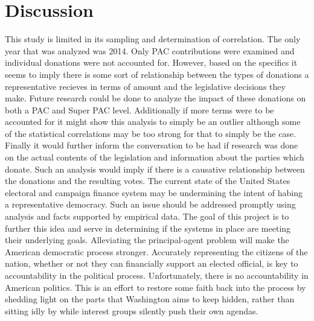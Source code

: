 \documentclass[journal]{IEEEtran}
\begin{document}
\section{Discussion}
This study is limited in its sampling and determination of correlation. The only year that was analyzed was 2014. Only PAC contributions were
examined and individual donations were not accounted for. However, based on the specifics it seems to imply there is some sort of relationship
between the types of donations a representative recieves in terms of amount and the legislative decisions they make.
Future research could be done to analyze the impact of these donations on both a PAC and Super PAC level. Additionally if more terms 
were to be accounted for it might show this analysis to simply be an outlier although some of the statistical correlations may be too 
strong for that to simply be the case. Finally it would further inform the conversation to be had if research was done on the actual 
contents of the legislation and information about the parties which donate. Such an analysis would imply if there is a causative 
relationship between the donations and the resulting votes.
The current state of the United States electoral and campaign finance system may be undermining the intent of habing a representative
democracy. Such an issue should be addressed promptly using analysis and facts supported by empirical data. The goal of this project
is to further this idea and serve in determining if the systems in place are meeting their underlying goals.
Alleviating the principal-agent problem will make the American democratic process stronger. Accurately representing the citizens 
of the nation, whether or not they can financially support an elected official, is key to accountability in the political process. 
Unfortunately, there is no accountability in American politics. This is an effort to restore some faith back into the process by 
shedding light on the parts that Washington aims to keep hidden, rather than sitting idly by while interest groups silently push 
their own agendas.
\end{document}
